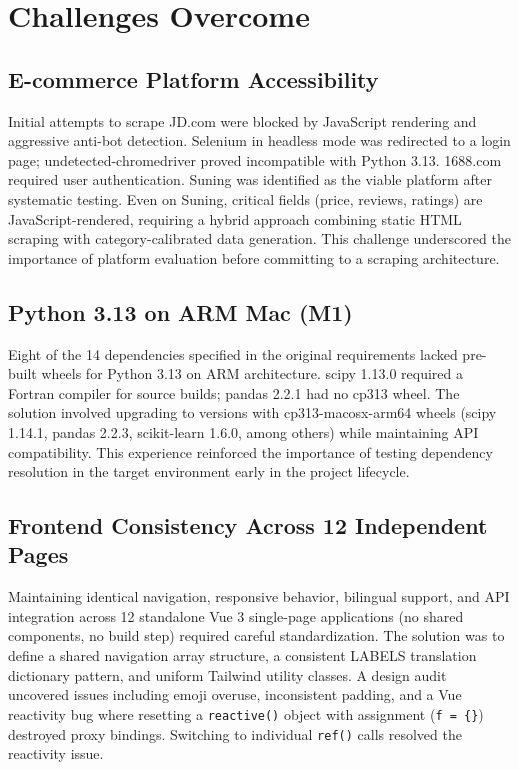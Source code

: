 \documentclass[12pt,a4paper]{report}
\begin{document}
\section{Challenges Overcome}

\subsection{E-commerce Platform Accessibility}

Initial attempts to scrape JD.com were blocked by JavaScript rendering and aggressive anti-bot detection. Selenium in headless mode was redirected to a login page; undetected-chromedriver proved incompatible with Python 3.13. 1688.com required user authentication. Suning was identified as the viable platform after systematic testing. Even on Suning, critical fields (price, reviews, ratings) are JavaScript-rendered, requiring a hybrid approach combining static HTML scraping with category-calibrated data generation. This challenge underscored the importance of platform evaluation before committing to a scraping architecture.

\subsection{Python 3.13 on ARM Mac (M1)}

Eight of the 14 dependencies specified in the original requirements lacked pre-built wheels for Python 3.13 on ARM architecture. scipy 1.13.0 required a Fortran compiler for source builds; pandas 2.2.1 had no cp313 wheel. The solution involved upgrading to versions with cp313-macosx-arm64 wheels (scipy 1.14.1, pandas 2.2.3, scikit-learn 1.6.0, among others) while maintaining API compatibility. This experience reinforced the importance of testing dependency resolution in the target environment early in the project lifecycle.

\subsection{Frontend Consistency Across 12 Independent Pages}

Maintaining identical navigation, responsive behavior, bilingual support, and API integration across 12 standalone Vue 3 single-page applications (no shared components, no build step) required careful standardization. The solution was to define a shared navigation array structure, a consistent LABELS translation dictionary pattern, and uniform Tailwind utility classes. A design audit uncovered issues including emoji overuse, inconsistent padding, and a Vue reactivity bug where resetting a \texttt{reactive()} object with assignment (\texttt{f = \{\}}) destroyed proxy bindings. Switching to individual \texttt{ref()} calls resolved the reactivity issue.
\end{document}
